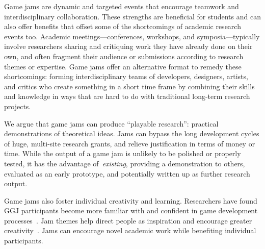 \documentclass{acm_proc_article-sp}
\newcommand{\mytodo}[1]{\textbf{[[#1]]}}
\begin{document}
%

Game jams are dynamic and targeted events that encourage teamwork and interdisciplinary collaboration.
These strengths are beneficial for students and can also offer benefits that offset some of the shortcomings of academic research events too.
Academic meetings---conferences, workshops, and symposia---typically involve researchers sharing and critiquing work they have already done on their own, and often fragment their audience or submissions according to research themes or expertise.
Game jams offer an alternative format to remedy these shortcomings: forming interdisciplinary teams of developers, designers, artists, and critics who create something in a short time frame by combining their skills and knowledge in ways that are hard to do with traditional long-term research projects.

We argue that game jams can produce ``playable research'': practical demonstrations of theoretical ideas.
Jams can bypass the long development cycles of huge, multi-site research grants, and relieve justification in terms of money or time.
While the output of a game jam is unlikely to be polished or properly tested, it has the advantage of~\emph{existing}, providing a demonstration to others, evaluated as an early prototype, and potentially written up as further research output.

Game jams also foster individual creativity and learning.
Researchers have found GGJ participants become more familiar with and confident in game development processes~\cite{arya2013:ggj-learn}.
Jam themes help direct people as inspiration and encourage greater creativity~\cite{kultima2011:ggj-creative, zook2013:ggj-conceptualization}.
Jams can encourage novel academic work while benefiting individual participants.
\end{document}
